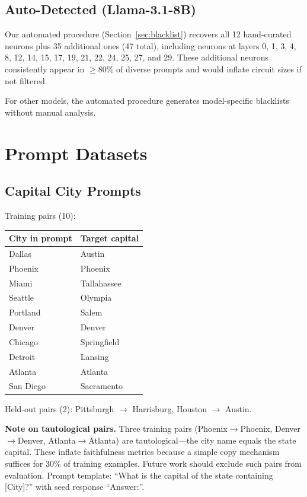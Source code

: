\documentclass[11pt]{article}
\begin{document}
\subsection{Auto-Detected (Llama-3.1-8B)}

Our automated procedure (Section~\ref{sec:blacklist}) recovers all 12 hand-curated neurons plus 35 additional ones (47 total), including neurons at layers 0, 1, 3, 4, 8, 12, 14, 15, 17, 19, 21, 22, 24, 25, 27, and 29.
These additional neurons consistently appear in $\geq$80\% of diverse prompts and would inflate circuit sizes if not filtered.

For other models, the automated procedure generates model-specific blacklists without manual analysis.


\section{Prompt Datasets}
\label{sec:prompts}

\subsection{Capital City Prompts}

Training pairs (10):

\begin{table}[h]
\centering
\small
\begin{tabular}{ll}
\toprule
\textbf{City in prompt} & \textbf{Target capital} \\
\midrule
Dallas       & Austin \\
Phoenix      & Phoenix \\
Miami        & Tallahassee \\
Seattle      & Olympia \\
Portland     & Salem \\
Denver       & Denver \\
Chicago      & Springfield \\
Detroit      & Lansing \\
Atlanta      & Atlanta \\
San Diego    & Sacramento \\
\bottomrule
\end{tabular}
\end{table}

Held-out pairs (2): Pittsburgh $\to$ Harrisburg, Houston $\to$ Austin.

\textbf{Note on tautological pairs.}
Three training pairs (Phoenix$\to$Phoenix, Denver$\to$Denver, Atlanta$\to$Atlanta) are tautological---the city name equals the state capital.
These inflate faithfulness metrics because a simple copy mechanism suffices for 30\% of training examples.
Future work should exclude such pairs from evaluation.
Prompt template: ``What is the capital of the state containing [City]?'' with seed response ``Answer:''.
\end{document}

